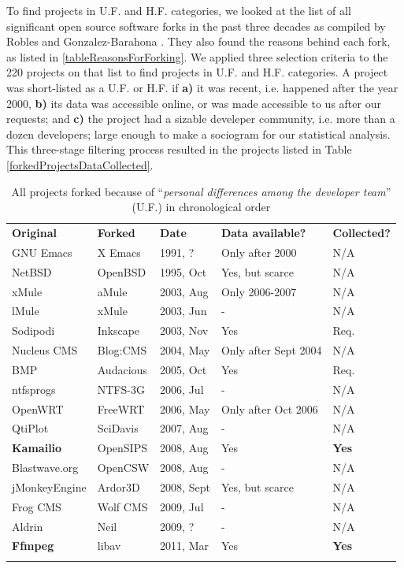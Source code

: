 \documentclass{acm_proc_article-sp}
\begin{document}
To find projects in U.F. and H.F. categories, we looked at the list of all significant open source software forks in the past three decades as compiled by Robles and Gonzalez-Barahona \cite{Robles}. They also found the reasons behind each fork, as listed in \ref{tableReasonsForForking}. We applied three selection criteria to the 220 projects on that list to find projects in U.F. and H.F. categories. A project was short-listed as a U.F. or H.F. if \textbf{a)} it was recent, i.e. happened after the year 2000, \textbf{b)} its data was accessible online, or was made accessible to us after our requests; and \textbf{c)} the project had a sizable develeper community, i.e. more than a dozen developers; large enough to make a sociogram for our statistical analysis. This three-stage filtering process resulted in the projects listed in Table \ref{forkedProjectsDataCollected}.

\begin{table}[!ht]
\centering
\caption{All projects forked because of ``\textit{personal differences among the developer team}'' (U.F.) \cite{Robles} in chronological order}
\label{tabelProjectsForkedCat1PersonalDiffereces}       
\begin{tabular}{m{} m{} m{} m{} m{}}
\hline\noalign{\smallskip}
\textbf{Original} & \textbf{Forked} & \textbf{Date} & \textbf{Data available?} & \textbf{Collected?}\\
\noalign{\smallskip}\hline\noalign{\smallskip}
GNU Emacs & X Emacs & 1991, ? & Only after 2000 & N/A \\ \hline
NetBSD & OpenBSD & 1995, Oct & Yes, but scarce & N/A \\ \hline
xMule & aMule & 2003, Aug & Only 2006-2007 & N/A \\ \hline
lMule & xMule & 2003, Jun & - & N/A \\ \hline
Sodipodi & Inkscape & 2003, Nov & Yes & Req.\\ \hline
Nucleus CMS & Blog:CMS & 2004, May & Only after Sept 2004 & N/A \\ \hline
BMP & Audacious & 2005, Oct & Yes & Req. \\ \hline
ntfsprogs & NTFS-3G & 2006, Jul & - & N/A \\ \hline
OpenWRT & FreeWRT & 2006, May & Only after Oct 2006 & N/A \\ \hline
QtiPlot & SciDavis & 2007, Aug & - & N/A \\ \hline
\textbf{Kamailio} & OpenSIPS & 2008, Aug & Yes & \textbf{Yes} \\ \hline
Blastwave.org & OpenCSW & 2008, Aug & - & N/A \\ \hline
jMonkeyEngine & Ardor3D & 2008, Sept & Yes, but scarce & N/A \\ \hline
Frog CMS & Wolf CMS & 2009, Jul & - & N/A \\ \hline
Aldrin & Neil & 2009, ? & - & N/A \\ \hline
\textbf{Ffmpeg} & libav & 2011, Mar & Yes & \textbf{Yes}\\
\noalign{\smallskip}\hline
\end{tabular}
\end{table}
\end{document}
